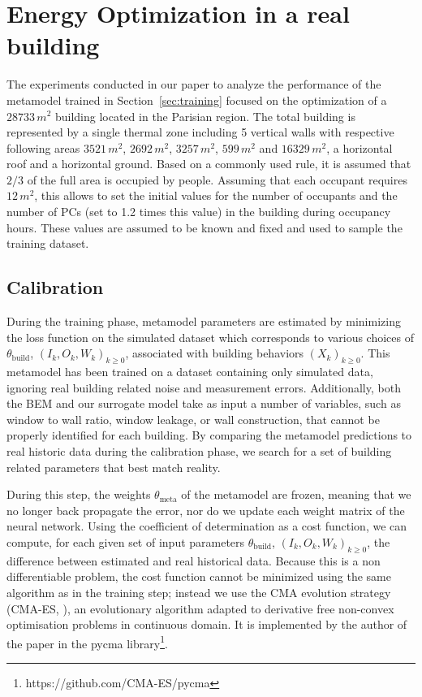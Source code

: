 \documentclass[12pt]{article}
\begin{document}
\section{Energy Optimization in a real building}
\label{sec:calib:optim}
The experiments conducted in our paper to analyze the performance of the metamodel trained in Section~\ref{sec:training} focused on the optimization of a $28733\, m^2$ building located in the Parisian region. The total building is represented by a single thermal zone including  5 vertical walls with respective following areas $3521\, m^2$, $2692\, m^2$, $3257\, m^2$, $599\, m^2$ and $16329\, m^2$, a horizontal roof and a horizontal ground. Based on a commonly used rule, it is assumed that $2/3$ of the full area is occupied by people. Assuming that each occupant requires $12\, m^2$, this allows to set the initial values for the number of occupants and the number of PCs (set to 1.2 times this value) in the building during occupancy hours. These values are assumed to be known and fixed and used to sample the training dataset.

\subsection{Calibration}
During the training phase, metamodel parameters are estimated by minimizing the loss function on the simulated dataset which corresponds to various choices of $\theta_{\mathrm{build}}$, $(I_k,O_k,W_k)_{k\geqslant 0}$, associated with building behaviors $(X_k)_{k\geqslant 0}$. This metamodel has been trained on a dataset containing only simulated data,  ignoring real building related noise and measurement errors. Additionally, both the BEM and our surrogate model take as input a number of variables, such as window to wall ratio, window leakage, or wall construction, that cannot be properly identified for each building. By comparing the metamodel predictions to real historic data during the calibration phase, we search for a set of building related parameters that best match reality.

During this step, the weights $\theta_{\mathrm{meta}}$ of the metamodel are frozen, meaning that we no longer back propagate the error, nor do we update each weight matrix of the neural network. Using the coefficient of determination as a cost function, we can compute, for each given set of input parameters $\theta_{\mathrm{build}}$, $(I_k,O_k,W_k)_{k\geqslant 0}$, the difference between estimated and real historical data. Because this is a non differentiable problem, the cost function cannot be minimized using the same algorithm as in the training step; instead we use the CMA evolution strategy (CMA-ES, \cite{Hansen2016TheCE}), an evolutionary algorithm adapted to derivative free non-convex optimisation problems in continuous domain. It is implemented by the author of the paper in the pycma library\footnote{https://github.com/CMA-ES/pycma}.
\end{document}
